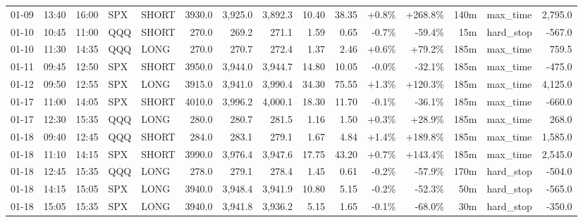 \documentclass[11pt,a4paper,twoside]{article}
\begin{document}
\begin{landscape}
\begin{center}
\begin{longtable}{>{\color{txtmain}}l l l l l r r r r r r r r >{\color{txtmain}}l r}
01-09 & 13:40 & 16:00 & SPX & SHORT & 3930.0 & 3,925.0 & 3,892.3 & 10.40 & 38.35 & \textcolor{wingreen}{+0.8\%} & \textcolor{wingreen}{+268.8\%} & 140m & max\_time & \textcolor{wingreen}{2,795.0} \\
01-10 & 10:45 & 11:00 & QQQ & SHORT & 270.0 & 269.2 & 271.1 & 1.59 & 0.65 & \textcolor{lossred}{-0.7\%} & \textcolor{lossred}{-59.4\%} & 15m & hard\_stop & \textcolor{lossred}{-567.0} \\
01-10 & 11:30 & 14:35 & QQQ & LONG & 270.0 & 270.7 & 272.4 & 1.37 & 2.46 & \textcolor{wingreen}{+0.6\%} & \textcolor{wingreen}{+79.2\%} & 185m & max\_time & \textcolor{wingreen}{759.5} \\
01-11 & 09:45 & 12:50 & SPX & SHORT & 3950.0 & 3,944.0 & 3,944.7 & 14.80 & 10.05 & \textcolor{lossred}{-0.0\%} & \textcolor{lossred}{-32.1\%} & 185m & max\_time & \textcolor{lossred}{-475.0} \\
01-12 & 09:50 & 12:55 & SPX & LONG & 3915.0 & 3,941.0 & 3,990.4 & 34.30 & 75.55 & \textcolor{wingreen}{+1.3\%} & \textcolor{wingreen}{+120.3\%} & 185m & max\_time & \textcolor{wingreen}{4,125.0} \\
01-17 & 11:00 & 14:05 & SPX & SHORT & 4010.0 & 3,996.2 & 4,000.1 & 18.30 & 11.70 & \textcolor{lossred}{-0.1\%} & \textcolor{lossred}{-36.1\%} & 185m & max\_time & \textcolor{lossred}{-660.0} \\
01-17 & 12:30 & 15:35 & QQQ & LONG & 280.0 & 280.7 & 281.5 & 1.16 & 1.50 & \textcolor{wingreen}{+0.3\%} & \textcolor{wingreen}{+28.9\%} & 185m & max\_time & \textcolor{wingreen}{268.0} \\
01-18 & 09:40 & 12:45 & QQQ & SHORT & 284.0 & 283.1 & 279.1 & 1.67 & 4.84 & \textcolor{wingreen}{+1.4\%} & \textcolor{wingreen}{+189.8\%} & 185m & max\_time & \textcolor{wingreen}{1,585.0} \\
01-18 & 11:10 & 14:15 & SPX & SHORT & 3990.0 & 3,976.4 & 3,947.6 & 17.75 & 43.20 & \textcolor{wingreen}{+0.7\%} & \textcolor{wingreen}{+143.4\%} & 185m & max\_time & \textcolor{wingreen}{2,545.0} \\
01-18 & 12:45 & 15:35 & QQQ & LONG & 278.0 & 279.1 & 278.4 & 1.45 & 0.61 & \textcolor{lossred}{-0.2\%} & \textcolor{lossred}{-57.9\%} & 170m & hard\_stop & \textcolor{lossred}{-504.0} \\
01-18 & 14:15 & 15:05 & SPX & LONG & 3940.0 & 3,948.4 & 3,941.9 & 10.80 & 5.15 & \textcolor{lossred}{-0.2\%} & \textcolor{lossred}{-52.3\%} & 50m & hard\_stop & \textcolor{lossred}{-565.0} \\
01-18 & 15:05 & 15:35 & SPX & LONG & 3940.0 & 3,941.8 & 3,936.2 & 5.15 & 1.65 & \textcolor{lossred}{-0.1\%} & \textcolor{lossred}{-68.0\%} & 30m & hard\_stop & \textcolor{lossred}{-350.0} \\

\end{longtable}
\end{center}
\end{landscape}
\end{document}

